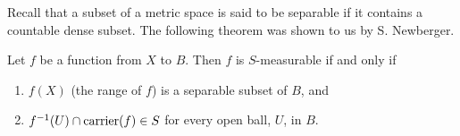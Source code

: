 Recall that a subset of a metric space is said to be separable if it contains a countable dense subset. The following theorem was shown to us by S. Newberger.

\begin{theorem}\label{thm:characterization of meas func}
Let $f$ be a function from $X$ to $B$. Then $f$ is $S$-measurable if and only if
\begin{enumerate}[label=\arabic*),ref=\arabic*)]
    \item\label{thm:item:sep range} $f(X)$ (the range of $f$) is a separable subset of $B$, and
    \item\label{thm:item:car} $f^{-1}(U)\cap\operatorname{carrier}(f)\in S$ for every open ball, $U$, in $B$.
\end{enumerate}
\end{theorem}

